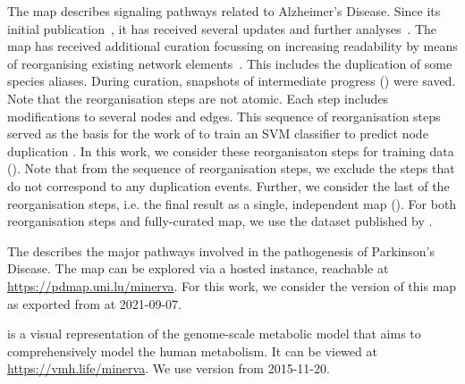 \documentclass[
	fontsize=10pt, %
	twoside=false, %
	secnumdepth=1, %
  toc=indentunnumbered %
]{kaobook}
\begin{document}
The  map describes signaling pathways related to Alzheimer's
Disease. Since its initial publication~\cite{mizuno_AlzPathwayComprehensiveMap_2012}, it has received several updates
and further analyses~\cite{ogishima_MapAlzheimerDiseasesignaling_2013,
  ogishima_AlzPathwayUpdatedMap_2016, mizuno_NetworkAnalysisComprehensive_2016}.
%
The map has received additional curation focussing on increasing readability by
means of reorganising existing network elements~\cite{ostaszewski_AlzPathwayRegorganisationSteps_2021}. This includes the
duplication of some species aliases. During curation, snapshots of intermediate
progress () were saved. Note that the reorganisation
steps are not atomic. Each step includes modifications to several nodes and
edges. This sequence of reorganisation steps served as the basis for the work of
\citeauthor{nielsen_MachineLearningSupport_2019} to train an SVM classifier to
predict node duplication \cite{nielsen_MachineLearningSupport_2019}. In this
work, we consider these reorganisaton steps for training data
(). Note that from the sequence of reorganisation
steps, we exclude the steps that do not correspond to any duplication events.
Further, we consider the last of the reorganisation steps, i.e. the final result
as a single, independent map (). For both
reorganisation steps and fully-curated map, we use the dataset published by
\citeauthor{ostaszewski_AlzPathwayRegorganisationSteps_2021}
\cite{ostaszewski_AlzPathwayRegorganisationSteps_2021}.

The  \cite{fujita_IntegratingPathwaysParkinson_2014} describes the
major pathways involved in the pathogenesis of Parkinson's Disease. The map can
be explored via a hosted  instance, reachable at
\url{https://pdmap.uni.lu/minerva}. For this work, we consider the version of
this map as exported from  at 2021-09-07.

\cite{noronha_ReconMapInteractiveVisualization_2017}
is a visual representation of the genome-scale metabolic model
 \cite{thiele_CommunitydrivenGlobalReconstruction_2013} that aims
to comprehensively model the human metabolism. It can be viewed at \url{https://vmh.life/minerva}.
We use version  from 2015-11-20.
\end{document}

